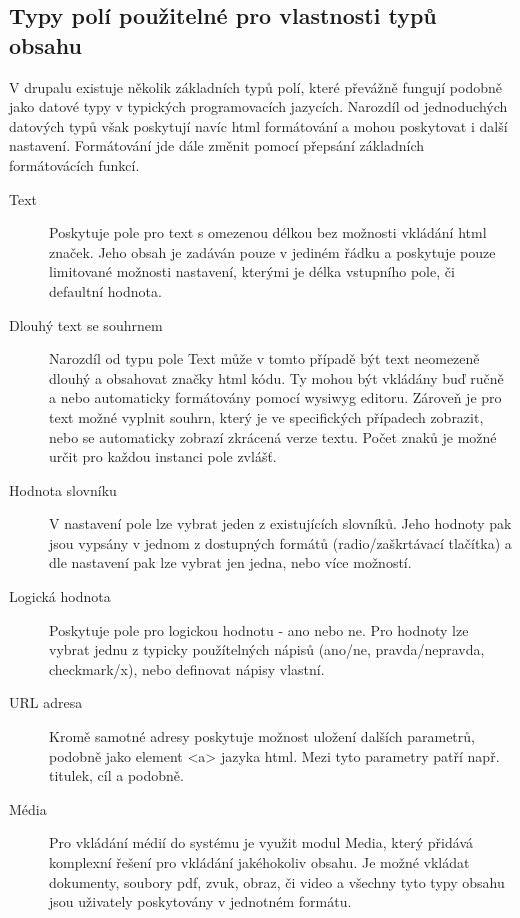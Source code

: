 \subsection{Typy polí použitelné pro vlastnosti typů obsahu}
V drupalu existuje několik základních typů polí, které převážně fungují podobně jako datové typy v typických programovacích jazycích. Narozdíl od jednoduchých datových typů však poskytují navíc html formátování a mohou poskytovat i další nastavení. Formátování jde dále změnit pomocí přepsání základních formátovácích funkcí.

\begin{description}
  \item[Text] Poskytuje pole pro text s omezenou délkou bez možnosti vkládání html značek. Jeho obsah je zadáván pouze v jediném řádku a poskytuje pouze limitované možnosti nastavení, kterými je délka vstupního pole, či defaultní hodnota. 
  
  \item[Dlouhý text se souhrnem] Narozdíl od typu pole Text může v tomto případě být text neomezeně dlouhý a obsahovat značky html kódu. Ty mohou být vkládány buď ručně a nebo automaticky formátovány pomocí \gls{wysiwyg} editoru. Zároveň je pro text možné vyplnit souhrn, který je ve specifických případech zobrazit, nebo se automaticky zobrazí zkrácená verze textu. Počet znaků je možné určit pro každou instanci pole zvlášť.
  
  \item[Hodnota slovníku] V nastavení pole lze vybrat jeden z existujících slovníků. Jeho hodnoty pak jsou vypsány v jednom z dostupných formátů (radio/zaškrtávací tlačítka) a dle nastavení pak lze vybrat jen jedna, nebo více možností.
  
  \item[Logická hodnota] Poskytuje pole pro logickou hodnotu - ano nebo ne. Pro hodnoty lze vybrat jednu z typicky použítelných nápisů (ano/ne, pravda/nepravda, checkmark/x), nebo definovat nápisy vlastní. 

  \item[URL adresa] Kromě samotné adresy poskytuje možnost uložení dalších parametrů, podobně jako element <a> jazyka html. Mezi tyto parametry patří např. titulek, cíl a podobně.

  \item[Média] Pro vkládání médií do systému je využit modul Media, který přidává komplexní řešení pro vkládání jakéhokoliv obsahu. Je možné vkládat dokumenty, soubory pdf, zvuk, obraz, či video a všechny tyto typy obsahu jsou uživately poskytovány v jednotném formátu.
  

\end{description}
